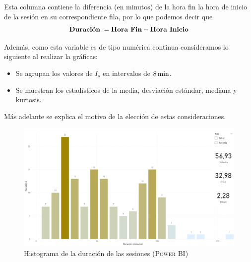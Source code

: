 \documentclass[11pt,a4paper]{book}
\theoremstyle{definition}%
\begin{document}
                Esta columna contiene la diferencia (en minutos) de la hora fin la hora de inicio de la sesión en su correspondiente fila, por lo que podemos decir que 
                \begin{equation*}
                    \textup{\textbf{Duración}}:=\textup{\textbf{Hora Fin}}-\textup{\textbf{Hora Inicio}}
                \end{equation*}
                
                Además, como esta variable es de tipo numérica continua consideramos lo siguiente al realizar la gráficas:
                \begin{itemize}
                    \item Se agrupan los valores de $I_s$ en intervalos de $8\,\textup{min}$.
                    \item Se muestran los estadísticos de la media, desviación estándar, mediana y kurtosis.
                \end{itemize}
                Más adelante se explica el motivo de la elección de estas consideraciones.
                \begin{figure}[H]
                    \centering
                    \includegraphics[width=1\textwidth]{Sources/histograma_DuracionGlobal.png}
                    \caption{Histograma de la duración de las sesiones (\textsc{Power BI})}
                    \label{fig:histograma_DuracionGlobal}
                \end{figure}
\end{document}
